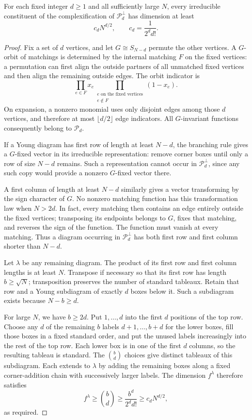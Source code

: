 \begin{lemma}\label{smooth:lem-dimension}
For each fixed integer \(d\ge1\) and all sufficiently large \(N\),
every irreducible constituent of the complexification of
\(\mathcal P_d^\perp\) has dimension at least
\[
 c_dN^{d/2},\qquad c_d=\frac1{2^dd!}.
\]
\end{lemma}

\begin{proof}
Fix a set of \(d\) vertices, and let \(G\cong S_{N-d}\) permute the
other vertices.  A \(G\)-orbit of matchings is determined by the
internal matching \(F\) on the fixed vertices: a permutation can
first align the outside partners of all unmatched fixed vertices
and then align the remaining outside edges.  The orbit indicator is
\[
 \prod_{e\in F}x_e
 \prod_{\substack{e\text{ on the fixed vertices}\\e\notin F}}(1-x_e).
\]
On expansion, a nonzero monomial uses only disjoint edges among
those \(d\) vertices, and therefore at most \(\lfloor d/2\rfloor\)
edge indicators.  All \(G\)-invariant functions consequently belong
to \(\mathcal P_d\).

If a Young diagram has first row of length at least \(N-d\), the
branching rule gives a \(G\)-fixed vector in its irreducible
representation: remove corner boxes until only a row of size
\(N-d\) remains.  Such a representation cannot occur in
\(\mathcal P_d^\perp\), since any such copy would provide a nonzero
\(G\)-fixed vector there.

A first column of length at least \(N-d\) similarly gives a vector
transforming by the sign character of \(G\).  No nonzero matching
function has this transformation law when \(N>2d\).  In fact,
every matching then contains an edge entirely outside the fixed
vertices; transposing its endpoints belongs to \(G\), fixes that
matching, and reverses the sign of the function.  The function must
vanish at every matching.  Thus a diagram occurring in
\(\mathcal P_d^\perp\) has both first row and first column shorter than
\(N-d\).

Let \(\lambda\) be any remaining diagram.  The product of its first
row and first column lengths is at least \(N\).  Transpose if
necessary so that its first row has length \(b\ge\sqrt N\);
transposition preserves the number of standard tableaux.  Retain
that row and a Young subdiagram of exactly \(d\) boxes below it.
Such a subdiagram exists because \(N-b\ge d\).

For large \(N\), we have \(b\ge2d\).  Put \(1,\ldots,d\) into the
first \(d\) positions of the top row.  Choose any \(d\) of the
remaining \(b\) labels \(d+1,\ldots,b+d\) for the lower boxes, fill
those boxes in a fixed standard order, and put the unused labels
increasingly into the rest of the top row.  Each lower box is in
one of the first \(d\) columns, so the resulting tableau is
standard.  The \(\binom bd\) choices give distinct tableaux of this
subdiagram.  Each extends to \(\lambda\) by adding the remaining
boxes along a fixed corner-addition chain with successively larger
labels.  The dimension \(f^\lambda\) therefore satisfies
\[
 f^\lambda\ge\binom bd
 \ge\frac{b^d}{2^dd!}
 \ge c_dN^{d/2},
\]
as required.
\end{proof}

